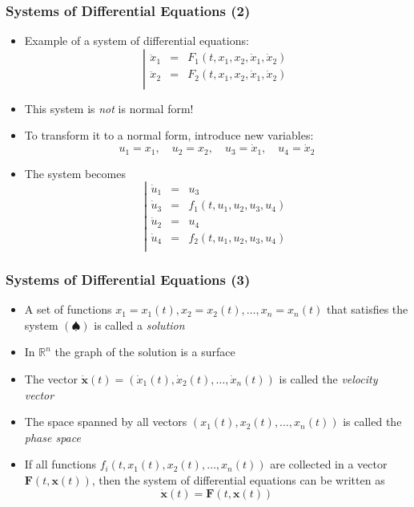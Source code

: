 \documentclass[10pt,usenames,dvipsnames]{beamer}
\theoremstyle{definition}
\begin{document}
\begin{frame}[fragile]
	\frametitle{Systems of Differential Equations (2)}
	\begin{itemize}
		\color{blue}
		\item Example of a system of differential equations:
		\[
			\left|
			\begin{array}{lcl}
				\ddot{x}_{1} & = & F_{1}(t, x_{1}, x_{2},\dot{x}_{1}, \dot{x}_{2})\\
				\ddot{x}_{2} & = & F_{2}(t, x_{1}, x_{2},\dot{x}_{1}, \dot{x}_{2})\\
			\end{array}\right.
		\]
		
		\color{black}
		\item This system is \textit{not} is normal form!
		
		\item To transform it to a normal form, introduce new variables:
		\[
			u_{1} = x_{1}, \quad u_{2} = x_{2}, \quad u_{3} = \dot{x}_{1}, \quad u_{4} = \dot{x}_{2}
		\]
		
		\item The system becomes
		\[
		\left|
		\begin{array}{lcl}
			\dot{u}_{1} & = & u_{3}\\
			\dot{u}_{3} & = & f_{1}(t, u_{1}, u_{2}, u_{3}, u_{4})\\
			\dot{u}_{2} & = & u_{4}\\
			\dot{u}_{4} & = & f_{2}(t, u_{1}, u_{2}, u_{3}, u_{4})\\	
		\end{array}\right.
		\]
	\end{itemize}
\end{frame}

\begin{frame}[fragile]
	\frametitle{Systems of Differential Equations (3)}
	\begin{itemize}
		\item A set of functions $ x_{1} = x_{1}(t), x_{2} = x_{2}(t), \ldots, x_{n} = x_{n}(t) $ that satisfies the system $ (\spadesuit) $ is called a \textit{solution}
		
		\item In $ \mathbb{R}^{n} $ the graph of the solution is a surface
		
		\item The vector $ \dot{\mathbf{x}}(t) = (\dot{x}_{1}(t), \dot{x}_{2}(t), \ldots, \dot{x}_{n}(t))$ is called the \textit{velocity vector}
		
		\item The space spanned by all vectors $ (x_{1}(t), x_{2}(t), \ldots, x_{n}(t)) $ is called the \textit{phase space}
		
		\item If all functions $ f_{i}(t, x_{1}(t), x_{2}(t),\ldots, x_{n}(t)) $ are collected in a vector $ \mathbf{F}(t, \mathbf{x}(t)) $, then the system of differential equations can be written as
		\[
			\dot{\mathbf{x}}(t) = \mathbf{F}(t, \mathbf{x}(t))
		\]
	\end{itemize}
\end{frame}
\end{document}
